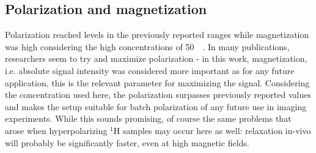         \subsection{Polarization and magnetization}
            Polarization reached levels in the previously reported ranges while magnetization was high considering the high concentrations of \SI{50}{\milli\molar}. In many publications, researchers seem to try and maximize polarization - in this work, magnetization, i.e. absolute signal intensity was considered more important as for any future application, this is the relevant parameter for maximizing the signal. Considering the concentration used here, the polarization surpasses previously reported values and makes the setup suitable for batch polarization of any future use in imaging experiments. While this sounds promising, of course the same problems that arose when hyperpolarizing $^{1}$H samples may occur here as well: relaxation in-vivo will probably be significantly faster, even at high magnetic fields.
